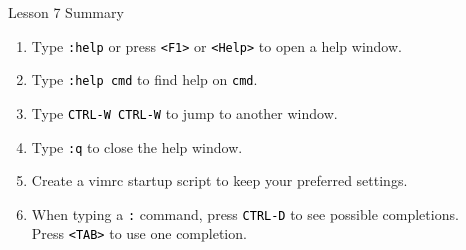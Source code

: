 \documentclass[handout, 10pt]{beamer}
\newcommand{\code}[2][black]{\textcolor{#1}{\colorbox{codegray}{\texttt{#2}}}}
\begin{document}
\begin{frame}{Lesson 7 Summary}
	\begin{enumerate}
		\item Type \code{:help} or press \code{<F1>} or \code{<Help>}  to open
			a help window.

		\item Type \code{:help cmd} to find help on \code{cmd}.

		\item Type \code{CTRL-W CTRL-W} to jump to another window.

		\item Type \code{:q} to close the help window.

		\item Create a vimrc startup script to keep your preferred settings.

		\item When typing a \code{:} command, press \code{CTRL-D} to see
			possible completions. \\
			Press \code{<TAB>} to use one completion.
	\end{enumerate}
\end{frame}
\end{document}
